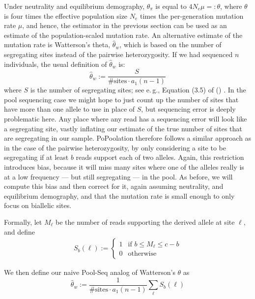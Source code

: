 \documentclass[letterpaper,fontsize=9pt,DIV=12]{scrartcl}
\newcommand\citeay[1]{\citeauthor{#1} (\citeyear{#1}) \cite{#1}}
\newcommand{\samplesize}{n}
\newcommand{\coverage}{c}
\begin{document}
Under neutrality and equilibrium demography, $\theta_\pi$ is equal to $4N_e\mu =: \theta$, where $\theta$ is four times the effective population size $N_e$ times the per-generation mutation rate $\mu$, and hence, the estimator in the previous section can be used as an estimate of the population-scaled mutation rate.  An alternative estimate of the mutation rate is Watterson's theta, $\widehat{\theta}_w$, which is based on the number of segregating sites instead of the pairwise heterozygosity.  If we had sequenced $n$ individuals, the usual definition of $\widehat{\theta}_w$ is:
\[
\widehat{\theta}_w := \frac{S}{\text{\# sites} \cdot a_1(n-1) }
\]
where $S$ is the number of segregating sites; see e.\,g., Equation (3.5) of \citeay{Hahn2018}. In the pool sequencing case we might hope to just count up the number of sites that have more than one allele to use in place of $S$, but sequencing error is deeply problematic here.  Any place where any read has a sequencing error will look like a segregating site, vastly inflating our estimate of the true number of sites that are segregating in our sample.  PoPoolation therefore follows a similar approach as in the case of the pairwise heterozygosity, by only considering a site to be segregating if at least $b$ reads support each of two alleles.  Again, this restriction introduces bias, because it will miss many sites where one of the alleles really is at a low frequency --- but still segregating --- in the pool.  As before, we will compute this bias and then correct for it, again assuming neutrality, and equilibrium demography, and that the mutation rate is small enough to only focus on biallelic sites.


Formally, let $M_\ell$ be the number of reads supporting the derived allele at site $\ell$, and define
\begin{align}
    S_b(\ell) :=
    \begin{cases}
        1 & \text{if } b \le M_\ell \le \coverage-b
        \\
        0 & \text{otherwise}
    \end{cases}
\end{align}
%

We then define our naive Pool-Seq analog of Watterson's $\theta$ as
\[
\widehat{\theta}_w :=\frac{1}{\text{\# sites} \cdot a_1(\samplesize-1)}\sum_{\ell} S_b(\ell)
\]
\end{document}
